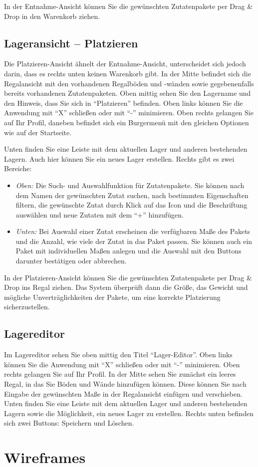 In der Entnahme-Ansicht können Sie die gewünschten Zutatenpakete per Drag \& Drop in den Warenkorb ziehen.

\subsection{Lageransicht – Platzieren}
Die Platzieren-Ansicht ähnelt der Entnahme-Ansicht, unterscheidet sich jedoch darin, dass es rechts unten keinen
Warenkorb gibt. In der Mitte befindet sich die Regalansicht mit den vorhandenen Regalböden und -wänden sowie
gegebenenfalls bereits vorhandenen Zutatenpaketen. Oben mittig sehen Sie den Lagername und den Hinweis, dass Sie
sich in ``Platzieren'' befinden. Oben links können Sie die Anwendung mit ``X'' schließen oder mit ``-'' minimieren.
Oben rechts gelangen Sie auf Ihr Profil, daneben befindet sich ein Burgermenü mit den gleichen Optionen wie auf der Startseite.

Unten finden Sie eine Leiste mit dem aktuellen Lager und anderen bestehenden Lagern. Auch hier können Sie ein neues
Lager erstellen. Rechts gibt es zwei Bereiche:
\begin{itemize}
	\item \textit{Oben:} Die Such- und Auswahlfunktion für Zutatenpakete. Sie können nach dem Namen der gewünschten Zutat suchen, nach bestimmten Eigenschaften filtern, die gewünschte Zutat durch Klick auf das Icon und die Beschriftung auswählen und neue Zutaten mit dem ``+'' hinzufügen.
	\item \textit{Unten:} Bei Auswahl einer Zutat erscheinen die verfügbaren Maße des Pakets und die Anzahl, wie viele der Zutat in das Paket passen. Sie können auch ein Paket mit individuellen Maßen anlegen und die Auswahl mit den Buttons darunter bestätigen oder abbrechen.
\end{itemize}

In der Platzieren-Ansicht können Sie die gewünschten Zutatenpakete per Drag \& Drop ins Regal ziehen. Das System
überprüft dann die Größe, das Gewicht und mögliche Unverträglichkeiten der Pakete, um eine korrekte Platzierung sicherzustellen.

\subsection{Lagereditor}
Im Lagereditor sehen Sie oben mittig den Titel ``Lager-Editor''. Oben links können Sie die Anwendung mit ``X''
schließen oder mit ``-'' minimieren. Oben rechts gelangen Sie auf Ihr Profil. In der Mitte sehen Sie zunächst ein
leeres Regal, in das Sie Böden und Wände hinzufügen können. Diese können Sie nach Eingabe der gewünschten Maße in der
Regalansicht einfügen und verschieben. Unten finden Sie eine Leiste mit dem aktuellen Lager und anderen bestehenden
Lagern sowie die Möglichkeit, ein neues Lager zu erstellen. Rechts unten befinden sich zwei Buttons: Speichern und Löschen.

\section{Wireframes}


